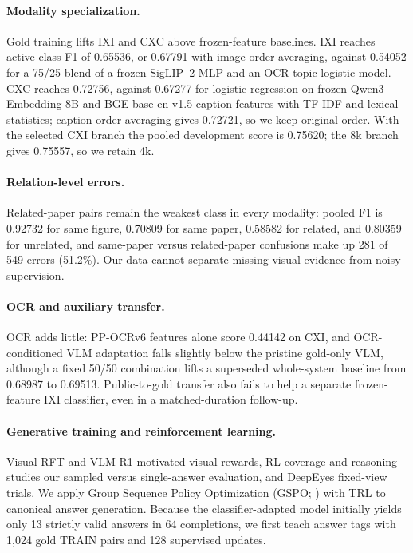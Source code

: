 \paragraph{Modality specialization.}
Gold training lifts IXI and CXC above frozen-feature baselines. IXI reaches active-class F1 of 0.65536, or 0.67791 with image-order averaging, against 0.54052 for a 75/25 blend of a frozen SigLIP~2 \citep{siglip2} MLP and an OCR-topic logistic model. CXC reaches 0.72756, against 0.67277 for logistic regression on frozen Qwen3-Embedding-8B \citep{qwen3embedding} and BGE-base-en-v1.5 \citep{bgemodel,bgecpack} caption features with TF-IDF and lexical statistics; caption-order averaging gives 0.72721, so we keep original order. With the selected CXI branch the pooled development score is 0.75620; the 8k branch gives 0.75557, so we retain 4k.

\paragraph{Relation-level errors.}
Related-paper pairs remain the weakest class in every modality: pooled F1 is 0.92732 for same figure, 0.70809 for same paper, 0.58582 for related, and 0.80359 for unrelated, and same-paper versus related-paper confusions make up 281 of 549 errors (51.2\%). Our data cannot separate missing visual evidence from noisy supervision.

\paragraph{OCR and auxiliary transfer.}
OCR adds little: PP-OCRv6 \citep{ppocr6} features alone score 0.44142 on CXI, and OCR-conditioned VLM adaptation falls slightly below the pristine gold-only VLM, although a fixed 50/50 combination lifts a superseded whole-system baseline from 0.68987 to 0.69513. Public-to-gold transfer also fails to help a separate frozen-feature IXI classifier, even in a matched-duration follow-up.

\paragraph{Generative training and reinforcement learning.}
Visual-RFT and VLM-R1 \citep{visualrft,vlmr1} motivated visual rewards, RL coverage and reasoning studies \citep{rlvrcoverage,rlvrreasoning} our sampled versus single-answer evaluation, and DeepEyes \citep{deepeyes} fixed-view trials. We apply Group Sequence Policy Optimization (GSPO; \citealp{gspo}) with TRL \citep{trl} to canonical answer generation. Because the classifier-adapted model initially yields only 13 strictly valid answers in 64 completions, we first teach answer tags with 1,024 gold TRAIN pairs and 128 supervised updates.

